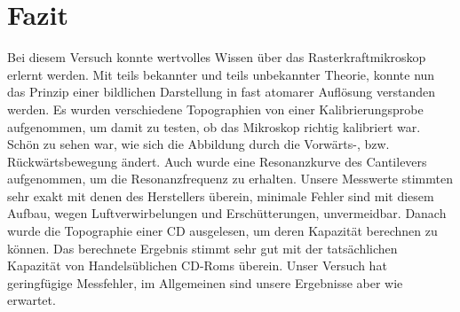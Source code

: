 \chapter{Fazit}

Bei diesem Versuch konnte wertvolles Wissen über das Rasterkraftmikroskop erlernt werden.
Mit teils bekannter und teils unbekannter Theorie, konnte nun das Prinzip einer bildlichen Darstellung in fast atomarer Auflösung verstanden werden.
Es wurden verschiedene Topographien von einer Kalibrierungsprobe aufgenommen, um damit zu testen, ob das Mikroskop richtig kalibriert war.
Schön zu sehen war, wie sich die Abbildung durch die Vorwärts-, bzw. Rückwärtsbewegung ändert.
Auch wurde eine Resonanzkurve des Cantilevers aufgenommen, um die Resonanzfrequenz zu erhalten.
Unsere Messwerte stimmten sehr exakt mit denen des Herstellers überein, minimale Fehler sind mit diesem Aufbau, wegen Luftverwirbelungen und Erschütterungen, unvermeidbar.
Danach wurde die Topographie einer CD ausgelesen, um deren Kapazität berechnen zu können.
Das berechnete Ergebnis stimmt sehr gut mit der tatsächlichen Kapazität von Handelsüblichen CD-Roms überein.
Unser Versuch hat geringfügige Messfehler, im Allgemeinen sind unsere Ergebnisse aber wie erwartet.
